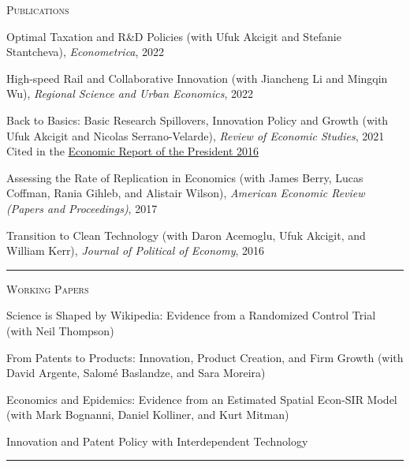 \documentclass{article}
\begin{document}
\parbox{\textwidth}{
\parbox[t]{0.28\textwidth}{ \raggedright \noindent \textsc{ Publications } }
\parbox[t]{0.72\textwidth}{ \raggedright

Optimal Taxation and R\&D Policies (with Ufuk Akcigit and Stefanie Stantcheva), \textit{Econometrica}, 2022
\vspace{0.27cm}

High-speed Rail and Collaborative Innovation (with Jiancheng Li and Mingqin Wu), \textit{Regional Science and Urban Economics}, 2022
\vspace{0.27cm}

Back to Basics: Basic Research Spillovers, Innovation Policy and Growth (with Ufuk Akcigit and Nicolas Serrano-Velarde), \textit{Review of Economic Studies}, 2021  \\
 Cited in the \href{https://www.gpo.gov/fdsys/pkg/ERP-2016/pdf/ERP-2016.pdf}{Economic Report of the President 2016}
\vspace{0.27cm}

Assessing the Rate of Replication in Economics (with James Berry, Lucas Coffman, Rania Gihleb, and Alistair Wilson), \textit{American Economic Review (Papers and Proceedings)}, 2017
\vspace{0.27cm}

Transition to Clean Technology (with Daron Acemoglu, Ufuk Akcigit, and William Kerr), \textit{Journal of Political of Economy}, 2016
\vspace{0.27cm}

}
\textcolor{light-gray}{\hrule}
}
\vspace{0.3cm}

\parbox{\textwidth}{
\parbox[t]{0.28\textwidth}{ \raggedright \noindent \textsc{ Working Papers } }
\parbox[t]{0.72\textwidth}{ \raggedright

Science is Shaped by Wikipedia: Evidence from a Randomized Control Trial (with Neil Thompson)
\vspace{0.27cm}

From Patents to Products: Innovation, Product Creation, and Firm Growth (with David Argente, Salomé Baslandze, and Sara Moreira)
\vspace{0.27cm}

Economics and Epidemics: Evidence from an Estimated Spatial Econ-SIR Model (with Mark Bognanni, Daniel Kolliner, and Kurt Mitman)
\vspace{0.27cm}

Innovation and Patent Policy with Interdependent Technology
\vspace{0.27cm}

}
\textcolor{light-gray}{\hrule}
}
\vspace{0.3cm}
\end{document}
